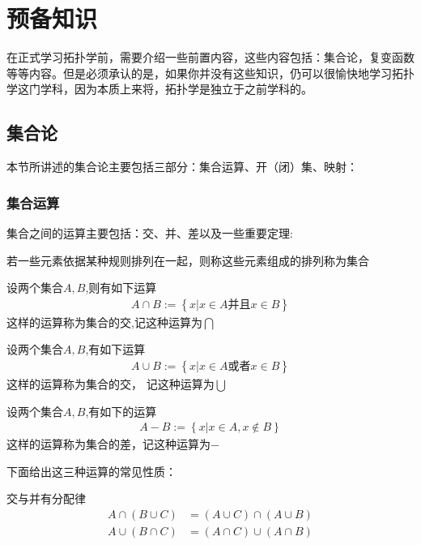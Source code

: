 \chapter{预备知识}
在正式学习拓扑学前，需要介绍一些前置内容，这些内容包括：集合论，复变函数等等内容。但是必须承认的是，如果你并没有这些知识，仍可以很愉快地学习拓扑学这门学科，因为本质上来将，拓扑学是独立于之前学科的。
\section{集合论}
本节所讲述的集合论主要包括三部分：集合运算、开（闭）集、映射：
\subsection*{集合运算}
集合之间的运算主要包括：交、并、差以及一些重要定理:
\begin{definition}
    若一些元素依据某种规则排列在一起，则称这些元素组成的排列称为集合
\end{definition}
\begin{definition}
    设两个集合\(A,B\),则有如下运算
    \begin{align}
        A\cap B :=\left\{x | x \in A \textbf{并且} x \in B \right \} 
    \end{align}
    这样的运算称为集合的交,记这种运算为\(\bigcap\)
\end{definition}
\begin{definition}
    设两个集合\(A,B\),有如下运算
    \begin{align}
        A \cup B:= \left\{x | x \in A \textbf{或者} x \in B  \right\}
    \end{align}
    这样的运算称为集合的交， 记这种运算为\(\bigcup\)
\end{definition}
\begin{definition}
    设两个集合\(A,B\),有如下的运算
    \begin{align}
        A-B := \left\{ x | x \in A , x \notin B  \right\}
    \end{align}
    这样的运算称为集合的差，记这种运算为\(- \)
\end{definition}
下面给出这三种运算的常见性质：
\begin{theorem}
    交与并有分配律
    \begin{align}
        A \cap (B \cup C) &=(A \cup C) \cap (A \cup B) \\
        A \cup(B \cap C) &= (A\cap C) \cup (A\cap B)
    \end{align}
\end{theorem}
